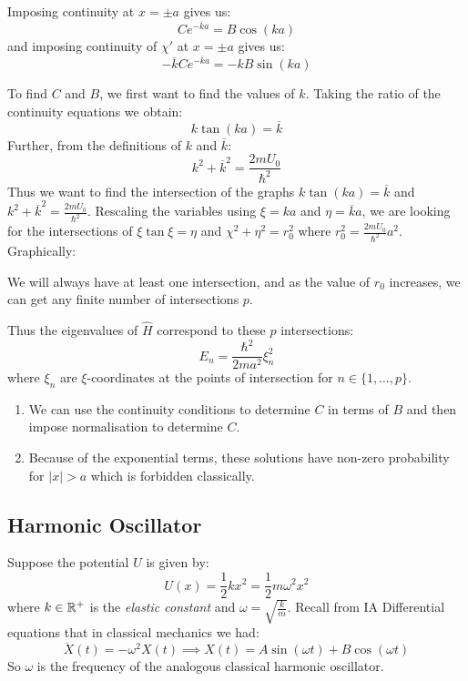 \documentclass[../main.tex]{subfiles}
\begin{document}
Imposing continuity at $x = \pm a$ gives us:
\[
  Ce^{-\overline{k} a} = B \cos(ka)
\]
and imposing continuity of $\chi'$ at $x = \pm a$ gives us:
\[
  -\overline{k} C e^{-\overline{k} a} = -k B \sin(ka)
\]

To find $C$ and $B$, we first want to find the values of $k$.
Taking the ratio of the continuity equations we obtain:
\[
  k \tan(ka) = \overline{k}
\]
Further, from the definitions of $k$ and $\overline{k}$:
\[
  k^2 + \overline{k}^2 = \frac{2mU_0}{\hbar^2}
\]
Thus we want to find the intersection of the graphs $k \tan(ka) = \overline{k}$ and $k^2 + \overline{k}^2 = \frac{2mU_0}{\hbar^2}$.
Rescaling the variables using $\xi = ka$ and $\eta = \overline{k} a$, we are looking for the intersections of $\xi \tan \xi = \eta$ and $\chi^2 + \eta^2 = r^2_0$ where $r^2_0 = \frac{2mU_0}{\hbar^2}a^2$.
Graphically:
\begin{center}
\end{center}
We will always have at least one intersection, and as the value of $r_0$ increases, we can get any finite number of intersections $p$.

Thus the eigenvalues of $\hat{H}$ correspond to these $p$ intersections:
\[
  E_n = \frac{\hbar^2}{2ma^2} \xi^2_n
\]
where $\xi_n$ are $\xi$-coordinates at the points of intersection for $n \in \{1, \ldots, p\}$.
\begin{remark}[Remarks]
  \begin{enumerate}
    \item We can use the continuity conditions to determine $C$ in terms of $B$ and then impose normalisation to determine $C$.
    \item Because of the exponential terms, these solutions have non-zero probability for $|x| > a$ which is forbidden classically.
  \end{enumerate}
\end{remark}
\subsection{Harmonic Oscillator} \label{harmonicSec}
Suppose the potential $U$ is given by:
\[
  U(x) = \frac{1}{2} kx^2 = \frac{1}{2} m\omega^2 x^2
\]
where $k \in \mathbb{R}^{+}$ is the \textit{elastic constant} and $\omega = \sqrt{\frac{k}{m}}$.
Recall from IA Differential equations that in classical mechanics we had:
\[
  \ddot{X}(t) = - \omega^2 X(t) \implies X(t) = A \sin(\omega t) + B \cos(\omega t)
\]
So $\omega$ is the frequency of the analogous classical harmonic oscillator.
\end{document}
